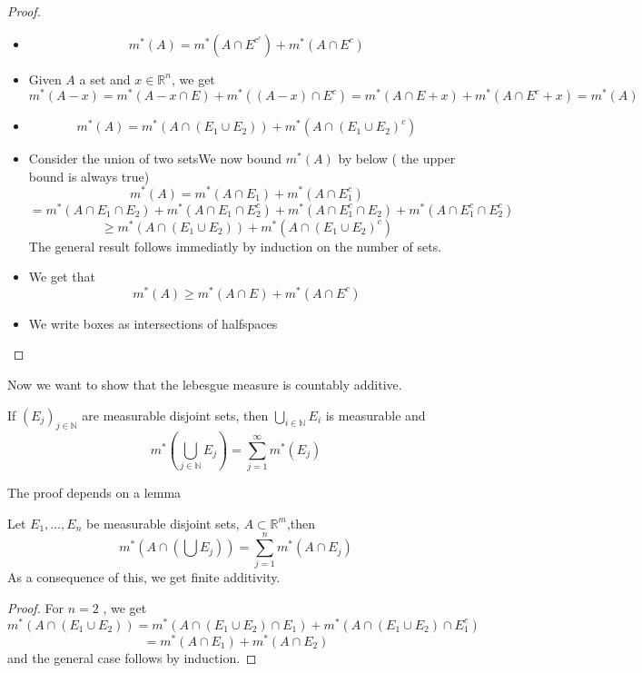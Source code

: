 \documentclass[../main.tex]{subfiles}
\begin{document}
\begin{proof}
	\begin{itemize}

	\item 
		\[ 
		m^{*}( A) =m^{*}( A\cap E^{c^{c}}) + m^{*}( A\cap E^{c}) 
		\]
	\item 
		Given $A$ a set and $x\in \mathbb{R}^n$, we get
		\[ 
		m^{*}( A-x) = m^{*}( A-x \cap E) +m^{*}( ( A-x) \cap E^{c}) = m^{*}( A\cap E+x) + m^{*}( A\cap E^{c}+x) = m^{* }( A) 
		\]

	\item 
		\[ 
		m^{*}( A) =m^{*}( A\cap ( E_1\cup E_2) ) + m^{*}( A\cap ( E_1\cup E_2)^{c} ) 
		\]
		
	\item Consider the union of two setsWe now bound $m^{*}( A) $ by below ( the upper bound is always true) 
		\[ 
		m^{*}( A) = m^{*}( A\cap E_1) +m^{*}( A\cap E_1^{c})
	\]
	\[ 
		=m^{*}( A\cap E_1\cap E_2) +m^{*}( A\cap E_1\cap E_2^{c}) +m^{*}( A\cap E_1^{c}\cap E_2) +m^{*}( A\cap E_1^{c}\cap E_2^{c})
	\]
	\[
		\geq m^{*}( A\cap ( E_1\cup E_2) ) + m^{*}( A\cap ( E_1\cup E_2)^{c} ) 
	\]
		The general result follows immediatly by induction on the number of sets.
	\item We get that
		\[ 
		m^{*}( A) \geq m^{*}( A\cap E) + m^{*}( A\cap E^{c}) 
		\]
		
	\item We write boxes as intersections of halfspaces
		
	\end{itemize}
	
\end{proof}
Now we want to show that the lebesgue measure is countably additive.
\begin{propo}
If $( E_j )_{j\in \mathbb{N}} $ are measurable disjoint sets, then $\bigcup_{i\in \mathbb{N}} E_i$ is measurable and
\[ 
m^{*}( \bigcup_{j\in \mathbb{N}} E_j) = \sum_{j=1}^{ \infty } m^{*}( E_j) 
\]

\end{propo}
The proof depends on a lemma
\begin{lemma}
Let $E_1,\ldots,E_n$ be measurable disjoint sets, $A \subset \mathbb{R}^m$,then
\[ 
m^{*}( A\cap ( \bigcup E_j) ) = \sum_{j=1}^{ n}m^{*}( A\cap E_j) 
\]
As a consequence of this, we get finite additivity.
\end{lemma}
\begin{proof}
For $n=2$ , we get
\[ 
m^{*}( A\cap ( E_1\cup E_2) ) =m^{*}( A\cap ( E_1\cup E_2) \cap E_1) + m^{*}( A\cap ( E_1\cup E_2) \cap E_1^{c}) 
\]
\[ 
=m^{*}( A\cap E_1) + m^{*}( A\cap E_2) 
\]
and the general case follows by induction.

\end{proof}
\end{document}
